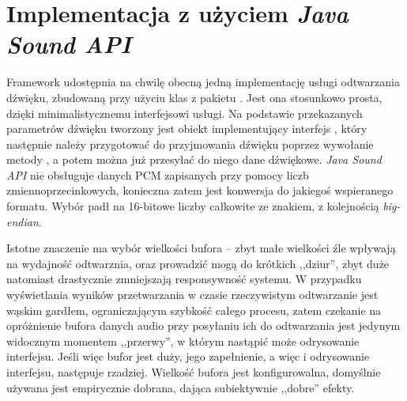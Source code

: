 \section{Implementacja z użyciem \emph{Java Sound API}}

Framework udostępnia na chwilę obecną jedną implementację usługi odtwarzania dźwięku, zbudowaną przy
użyciu klas z pakietu . Jest ona stosunkowo prosta, dzięki minimalistycznemu
interfejsowi usługi. Na podstawie przekazanych parametrów dźwięku tworzony jest obiekt
implementujący interfejs , który następnie należy przygotować do przyjmowania
dźwięku poprzez wywołanie metody , a potem można już przesyłać do niego dane dźwiękowe.
\emph{Java Sound API} nie obsługuje danych PCM zapisanych przy pomocy liczb zmiennoprzecinkowych,
konieczna zatem jest konwersja do jakiegoś wspieranego formatu. Wybór padł na 16-bitowe liczby
całkowite ze znakiem, z kolejnością \textit{big-endian}.

\begin{NoteLong}
Istotne znaczenie ma wybór wielkości bufora -- zbyt małe wielkości źle wpływają na wydajność
odtwarznia, oraz prowadzić mogą do krótkich ,,dziur'', zbyt duże natomiast drastycznie zmniejszają
responsywność systemu. W przypadku wyświetlania wyników przetwarzania w czasie rzeczywistym
odtwarzanie jest wąskim gardłem, ograniczającym szybkość całego procesu, zatem czekanie na
opróżnienie bufora danych audio przy posyłaniu ich do odtwarzania jest jedynym widocznym momentem
,,przerwy'', w którym nastąpić może odrysowanie interfejsu. Jeśli więc bufor jest duży, jego
zapełnienie, a więc i odrysowanie interfejsu, następuje rzadziej. Wielkość bufora jest
konfigurowalna, domyślnie używana jest empirycznie dobrana, dająca subiektywnie ,,dobre'' efekty.
\end{NoteLong}

